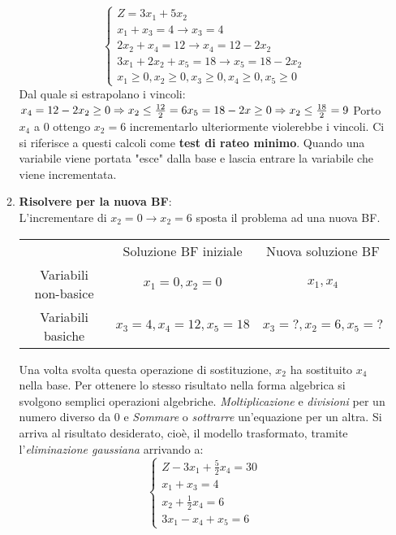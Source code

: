 \documentclass{article}
\begin{document}
\begin{tcolorbox}[breakable]
\begin{itemize}
\begin{enumerate}
                  $$
                    \begin{cases}
                      Z = 3x_1 + 5x_2                        \\
                      x_1+x_3 =  4 \to x_3=4                 \\
                      2x_2 +x_4 =  12 \to x_4 = 12 - 2x_2    \\
                      3x_1+2x_2+x_5 = 18 \to x_5 = 18 - 2x_2 \\
                      x_1 \ge 0,
                      x_2 \ge 0,
                      x_3 \ge 0,
                      x_4 \ge 0,
                      x_5 \ge 0
                    \end{cases}
                  $$
                  Dal quale si estrapolano i vincoli:
                  $
                    \\
                    x_4=12-2x_2\ge 0 \Rightarrow x_2\le \frac{12}{2}=6 \\
                    x_5=18-2x\ge 0 \Rightarrow x_2 \le \frac{18}{2}=9
                  $
                  Porto $x_4$ a $0$ ottengo $x_2=6$ incrementarlo ulteriormente violerebbe i vincoli. Ci si riferisce a questi calcoli come \textbf{test di rateo minimo}. Quando una variabile viene portata "esce" dalla base e lascia entrare la variabile che viene incrementata.
            \item \textbf{Risolvere per la nuova BF}: \\
                  L'incrementare di $x_2=0\to x_2=6$ sposta il problema ad una nuova BF.
                  \begin{tabular}{ c c c }
                                         & Soluzione BF iniziale & Nuova soluzione BF    \\
                    Variabili non-basice & $x_1=0,x_2=0$         & $x_1,x_4$             \\
                    Variabili basiche    & $x_3=4,x_4=12,x_5=18$ & $x_3=?, x_2=6, x_5=?$
                  \end{tabular}
                  Una volta svolta questa operazione di sostituzione, $x_2$ ha sostituito $x_4$ nella base. Per ottenere lo stesso risultato nella forma algebrica si svolgono semplici operazioni algebriche. \textit{Moltiplicazione} e \textit{divisioni} per un numero diverso da $0$ e \textit{Sommare} o \textit{sottrarre} un'equazione per un altra. Si arriva al risultato desiderato, cioè, il modello trasformato, tramite l'\textit{eliminazione gaussiana} arrivando a:
                  $$
                    \begin{cases}
                      Z-3x_1+\frac{5}{2}x_4=30 \\
                      x_1+x_3=4                \\
                      x_2 + \frac{1}{2}x_4=6   \\
                      3x_1-x_4+x_5=6
                    \end{cases}
                  $$


\end{enumerate}
\end{itemize}
\end{tcolorbox}
\end{document}
